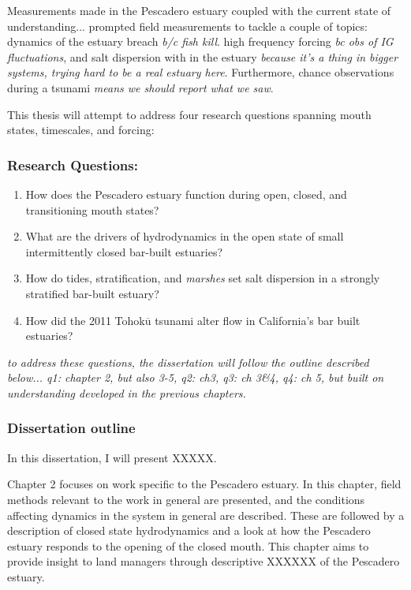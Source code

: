 Measurements made in the Pescadero estuary coupled with the current state of understanding... prompted field measurements to tackle a couple of topics: dynamics of the estuary breach \emph{b/c fish kill}. high frequency forcing \emph{bc obs of IG fluctuations}, and salt dispersion with in the estuary \emph{because it's a thing in bigger systems, trying hard to be a real estuary here}. Furthermore, chance observations during a tsunami \emph{means we should report what we saw}. 

This thesis will attempt to address four research questions spanning mouth states, timescales, and forcing: 


\subsubsection{Research Questions:}
\begin{enumerate}
	\item{How does the Pescadero estuary function during open, closed, and transitioning mouth states?}
	\item{What are the drivers of hydrodynamics in the open state of small intermittently closed bar-built estuaries?}
	\item{How do tides, stratification, and \emph{marshes} set salt dispersion in a strongly stratified bar-built estuary?}
	\item{How did the 2011 Tohok$\overline{\mathrm{u}}$ tsunami alter flow in California's bar built estuaries?}
\end{enumerate}

\emph{to address these questions, the dissertation will follow the outline described below... q1: chapter 2, but also 3-5, q2: ch3, q3: ch 3\&4, q4: ch 5, but built on understanding developed in the previous chapters.}


\subsubsection{Dissertation outline}

In this dissertation, I will present XXXXX.

Chapter 2 focuses on work specific to the Pescadero estuary. In this chapter, field methods relevant to the work in general are presented, and the conditions affecting dynamics in the system in general are described. These are followed by a description of closed state hydrodynamics and a look at how the Pescadero estuary responds to the opening of the closed mouth. This chapter aims to provide insight to land managers through descriptive XXXXXX of the Pescadero estuary.

